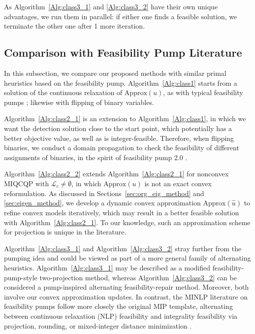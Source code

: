 \documentclass[]{article}
\begin{document}
As Algorithm~\ref{Alg:class3_1} and \ref{Alg:class3_2} have their own unique advantages, we run them in parallel: if either one finds a feasible solution, we terminate the other one after 1 more iteration.

\subsection{Comparison with Feasibility Pump Literature}\label{sec:comp_methods}

In this subsection, we compare our proposed methods with similar primal heuristics based on the feasibility pump. Algorithm~\ref{Alg:class1} starts from a solution of the continuous relaxation of $\mbox{Approx}(u)$, as with typical feasibility pumps \cite{fischetti2005feasibility,fischetti2009feasibility}; likewise with flipping of binary variables.

Algorithm~\ref{Alg:class2_1} is an extension to Algorithm~\ref{Alg:class1}, in which we want the detection solution close to the start point, which potentially has a better objective value, as well as is integer-feasible. Therefore, when flipping binaries, we conduct a domain propagation to check the feasibility of different assignments of binaries, in the spirit of feasibility pump 2.0 \cite{fischetti2009feasibility}.

Algorithm~\ref{Alg:class2_2} extends Algorithm~\ref{Alg:class2_1} for nonconvex MIQCQP with $\mathcal{L}_c\neq\emptyset$, in which $\mbox{Approx}(u)$ is not an exact convex reformulation. As discussed in Sections~\ref {sec:org_eig_method} and \ref{sec:eigen_method}, we develop a dynamic convex approximation $\mbox{Approx}(\hat{u})$ to refine convex models iteratively, which may result in a better feasible solution with Algorithm~\ref{Alg:class2_1}. To our knowledge, such an approximation scheme for projection is unique in the literature.

Algorithm~\ref{Alg:class3_1} and Algorithm~\ref{Alg:class3_2} stray further from the pumping idea and could be viewed as part of a more general family of alternating heuristics. Algorithm~\ref{Alg:class3_1} may be described as a modified feasibility-pump-style two-projection method, whereas Algorithm~\ref{Alg:class3_2} can be considered a pump-inspired alternating feasibility-repair method. Moreover, both involve our convex approximation updates. In contrast, the MINLP literature on feasibility pumps follow more closely the original MIP template, alternating between continuous relaxation (NLP) feasibility and integrality feasibility via projection, rounding, or mixed-integer distance minimization \cite{d2012storm,belotti2017three}.
\end{document}
